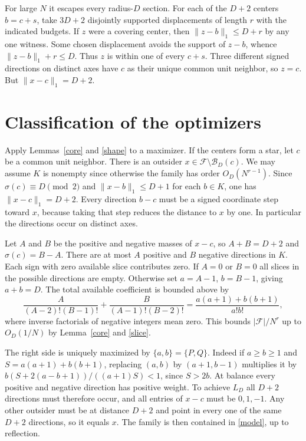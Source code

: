 \documentclass[10pt]{article}
\newcommand{\F}{\mathcal F}
\newcommand{\s}{\sigma}
\newcommand{\B}{\mathcal B}
\newcommand{\norm}[1]{\lVert #1\rVert_1}
\begin{document}
For large $N$ it escapes every radius-$D$ section. For each of the $D+2$ centers $b=c+s$, take $3D+2$ disjointly supported displacements of length $r$ with the indicated budgets. If $z$ were a covering center, then $\norm{z-b}\le D+r$ by any one witness. Some chosen displacement avoids the support of $z-b$, whence $\norm{z-b}+r\le D$. Thus $z$ is within one of every $c+s$. Three different signed directions on distinct axes have $c$ as their unique common unit neighbor, so $z=c$. But $\norm{x-c}=D+2$.

\section{Classification of the optimizers}

Apply Lemmas~\ref{core} and \ref{shape} to a maximizer. If the centers form a star, let $c$ be a common unit neighbor. There is an outsider $x\in\F\setminus\B_D(c)$. We may assume $K$ is nonempty since otherwise the family has order $O_D(N^{r-1})$. Since $\s(c)\equiv D\pmod2$ and $\norm{x-b}\le D+1$ for each $b\in K$, one has $\norm{x-c}=D+2$. Every direction $b-c$ must be a signed coordinate step toward $x$, because taking that step reduces the distance to $x$ by one. In particular the directions occur on distinct axes.

Let $A$ and $B$ be the positive and negative masses of $x-c$, so $A+B=D+2$ and $\s(c)=B-A$. There are at most $A$ positive and $B$ negative directions in $K$. Each sign with zero available slice contributes zero. If $A=0$ or $B=0$ all slices in the possible directions are empty. Otherwise set $a=A-1$, $b=B-1$, giving $a+b=D$. The total available coefficient is bounded above by
\[
 \frac{A}{(A-2)!(B-1)!}+\frac{B}{(A-1)!(B-2)!}
 =\frac{a(a+1)+b(b+1)}{a!b!},
 \tag{7}\label{starweight}
\]
where inverse factorials of negative integers mean zero. This bounds $|\F|/N^r$ up to $O_D(1/N)$ by Lemma~\ref{core} and \eqref{slice}.

The right side is uniquely maximized by $\{a,b\}=\{P,Q\}$. Indeed if $a\ge b\ge1$ and $S=a(a+1)+b(b+1)$, replacing $(a,b)$ by $(a+1,b-1)$ multiplies it by $b(S+2(a-b+1))/((a+1)S)<1$, since $S>2b$. At balance every positive and negative direction has positive weight. To achieve $L_D$ all $D+2$ directions must therefore occur, and all entries of $x-c$ must be $0,1,-1$. Any other outsider must be at distance $D+2$ and point in every one of the same $D+2$ directions, so it equals $x$. The family is then contained in \eqref{model}, up to reflection.
\end{document}
